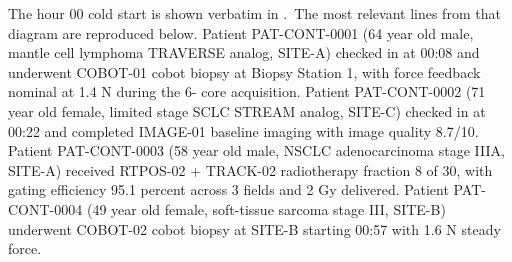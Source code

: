 The hour 00 cold start is shown verbatim in
.\
The most relevant lines from that diagram are reproduced below. Patient
PAT-CONT-0001 (64 year old male, mantle cell lymphoma TRAVERSE analog,
SITE-A) checked in at 00:08 and underwent COBOT-01 cobot biopsy at
Biopsy Station 1, with force feedback nominal at 1.4 N during the 6-
core acquisition. Patient PAT-CONT-0002 (71 year old female, limited
stage SCLC STREAM analog, SITE-C) checked in at 00:22 and completed
IMAGE-01 baseline imaging with image quality 8.7/10. Patient
PAT-CONT-0003 (58 year old male, NSCLC adenocarcinoma stage IIIA,
SITE-A) received RTPOS-02 + TRACK-02 radiotherapy fraction 8 of 30,
with gating efficiency 95.1 percent across 3 fields and 2 Gy
delivered. Patient PAT-CONT-0004 (49 year old female, soft-tissue
sarcoma stage III, SITE-B) underwent COBOT-02 cobot biopsy at SITE-B
starting 00:57 with 1.6 N steady force.

\clearpage

